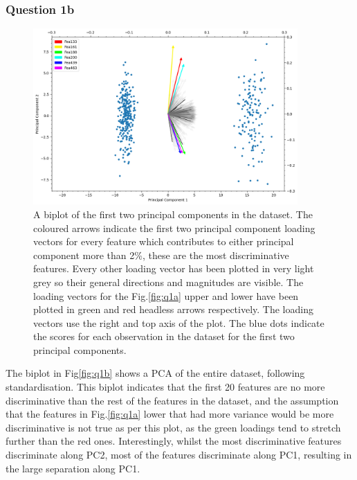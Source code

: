 \subsubsection{Question 1b}\label{subsubsec:q1b}

    \begin{figure}[htb]
    \centering
    \includegraphics[width=0.9\textwidth]{./figures/q1b}
    \caption{A biplot of the first two principal components in the  dataset.
        The coloured arrows indicate the first two principal component loading vectors for every feature which contributes to
        either principal component more than 2\%, these are the most discriminative features.
        Every other loading vector has been plotted in very light grey so their general directions and magnitudes are
        visible.
        The loading vectors for the Fig.\eqref{fig:q1a} upper and lower have been plotted in green and red headless
        arrows respectively.
        The loading vectors use the right and top axis of the plot.
        The blue dots indicate the scores for each observation in the dataset for the first two principal components.}
    \label{fig:q1b}
    \end{figure}

    The biplot in Fig\eqref{fig:q1b} shows a PCA of the entire dataset, following standardisation.
    This biplot indicates that the first 20 features are no more discriminative than the rest of the features in the
    dataset, and the assumption that the features in Fig.\eqref{fig:q1a} lower that had more variance would be more
    discriminative is not true as per this plot, as the green loadings tend to stretch further than the red ones.
    Interestingly, whilst the most discriminative features discriminate along PC2, most of the features discriminate
    along PC1, resulting in the large separation along PC1.

